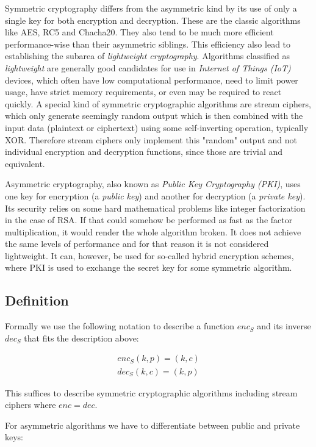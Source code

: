 \documentclass[a4paper,10pt,openright]{memoir}
\def\enc{\ensuremath{\mathit{enc}}}
\def\dec{\ensuremath{\mathit{dec}}}
\newcommand{\term}[1]{\textit{#1}}
\begin{document}
Symmetric cryptography differs from the asymmetric kind by its use of 
only a single key for both encryption and decryption. These are the 
classic algorithms like AES, RC5 and Chacha20. They also tend to be 
much more efficient performance-wise than their asymmetric siblings. 
This efficiency also lead to establishing the subarea of 
\term{lightweight cryptography}. Algorithms classified as 
\term{lightweight} are generally good candidates for use in 
\term{Internet of Things (IoT)} devices, which often have low 
computational performance, need to limit power usage, have strict 
memory requirements, or even may be required to react quickly. A 
special kind of symmetric cryptographic algorithms are stream ciphers, 
which only generate seemingly random output which is then combined with 
the input data (plaintext or ciphertext) using some self-inverting 
operation, typically XOR. Therefore stream ciphers only implement this 
"random" output and not individual encryption and decryption functions, 
since those are trivial and equivalent.

Asymmetric cryptography, also known as \term{Public Key Cryptography 
(PKI)}, uses one key for encryption (a \term{public key}) and another 
for decryption (a \term{private key}). Its security relies on some hard 
mathematical problems like integer factorization in the case of RSA. If 
that could somehow be performed as fast as the factor multiplication, 
it would render the whole algorithm broken. It does not achieve the 
same levels of performance \cite{sym-asym} and for that reason it is not 
considered lightweight. It can, however, be used for so-called hybrid 
encryption schemes, where PKI is used to exchange the secret key for 
some symmetric algorithm.

\subsection{Definition}

Formally we use the following notation to describe a function 
$\enc_S$ and its inverse $\dec_S$ that fits the description above:

\begin{align*}
\enc_S(k,p) = (k,c) \\
\dec_S(k,c) = (k,p) 
\end{align*}

This suffices to describe symmetric cryptographic algorithms including 
stream ciphers where $\enc = \dec$.

For asymmetric algorithms we have to differentiate between public and 
private keys:
\end{document}
